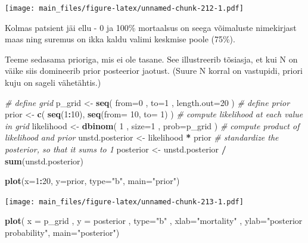 \documentclass[]{book}
\newenvironment{Shaded}{\begin{snugshade}}{\end{snugshade}}
\newcommand{\KeywordTok}[1]{\textcolor[rgb]{0.13,0.29,0.53}{\textbf{#1}}}
\newcommand{\DataTypeTok}[1]{\textcolor[rgb]{0.13,0.29,0.53}{#1}}
\newcommand{\DecValTok}[1]{\textcolor[rgb]{0.00,0.00,0.81}{#1}}
\newcommand{\StringTok}[1]{\textcolor[rgb]{0.31,0.60,0.02}{#1}}
\newcommand{\CommentTok}[1]{\textcolor[rgb]{0.56,0.35,0.01}{\textit{#1}}}
\newcommand{\OperatorTok}[1]{\textcolor[rgb]{0.81,0.36,0.00}{\textbf{#1}}}
\newcommand{\NormalTok}[1]{#1}
\begin{document}
\texttt{[image: main\_files/figure-latex/unnamed-chunk-212-1.pdf]}

Kolmas patsient jäi ellu - 0 ja 100\% mortaalsus on seega võimaluste
nimekirjast maas ning suremus on ikka kaldu valimi keskmise poole
(75\%).

Teeme sedasama prioriga, mis ei ole tasane. See illustreerib tõsiasja,
et kui N on väike siis domineerib prior posteerior jaotust. (Suure N
korral on vastupidi, priori kuju on sageli vähetähtis.)

\begin{Shaded}
\begin{Highlighting}[]
\CommentTok{# define grid}
\NormalTok{p_grid <-}\StringTok{ }\KeywordTok{seq}\NormalTok{( }\DataTypeTok{from=}\DecValTok{0}\NormalTok{ , }\DataTypeTok{to=}\DecValTok{1}\NormalTok{ , }\DataTypeTok{length.out=}\DecValTok{20}\NormalTok{ )}
\CommentTok{# define prior}
\NormalTok{prior <-}\StringTok{ }\KeywordTok{c}\NormalTok{( }\KeywordTok{seq}\NormalTok{(}\DecValTok{1}\OperatorTok{:}\DecValTok{10}\NormalTok{), }\KeywordTok{seq}\NormalTok{(}\DataTypeTok{from=} \DecValTok{10}\NormalTok{, }\DataTypeTok{to=} \DecValTok{1}\NormalTok{) )}
\CommentTok{# compute likelihood at each value in grid}
\NormalTok{likelihood <-}\StringTok{ }\KeywordTok{dbinom}\NormalTok{( }\DecValTok{1}\NormalTok{ , }\DataTypeTok{size=}\DecValTok{1}\NormalTok{ , }\DataTypeTok{prob=}\NormalTok{p_grid )}
\CommentTok{# compute product of likelihood and prior}
\NormalTok{unstd.posterior <-}\StringTok{ }\NormalTok{likelihood }\OperatorTok{*}\StringTok{ }\NormalTok{prior}
\CommentTok{# standardize the posterior, so that it sums to 1}
\NormalTok{posterior <-}\StringTok{ }\NormalTok{unstd.posterior }\OperatorTok{/}\StringTok{ }\KeywordTok{sum}\NormalTok{(unstd.posterior)}

\KeywordTok{plot}\NormalTok{(}\DataTypeTok{x=}\DecValTok{1}\OperatorTok{:}\DecValTok{20}\NormalTok{, }\DataTypeTok{y=}\NormalTok{prior, }\DataTypeTok{type=}\StringTok{"b"}\NormalTok{, }\DataTypeTok{main=}\StringTok{"prior"}\NormalTok{)}
\end{Highlighting}
\end{Shaded}

\texttt{[image: main\_files/figure-latex/unnamed-chunk-213-1.pdf]}

\begin{Shaded}
\begin{Highlighting}[]
\KeywordTok{plot}\NormalTok{( }\DataTypeTok{x =}\NormalTok{ p_grid , }\DataTypeTok{y =}\NormalTok{ posterior , }\DataTypeTok{type=}\StringTok{"b"}\NormalTok{ ,}
    \DataTypeTok{xlab=}\StringTok{"mortality"}\NormalTok{ , }\DataTypeTok{ylab=}\StringTok{"posterior probability"}\NormalTok{, }\DataTypeTok{main=}\StringTok{"posterior"}\NormalTok{)}
\end{Highlighting}
\end{Shaded}
\end{document}
